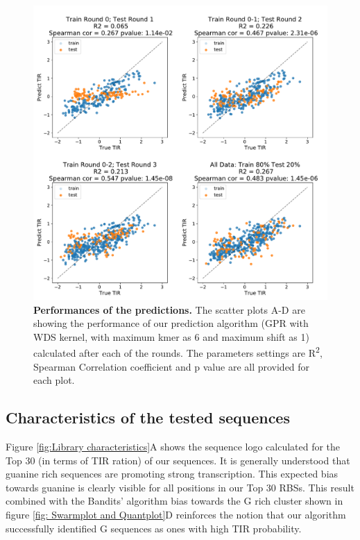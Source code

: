 \documentclass{article}
\begin{document}
\begin{figure}[!ht]
    \centering
    \includegraphics[scale=0.4]{plots/Main_Paper/scatter_abc1_FF.pdf}
    \caption{\textbf{Performances of the predictions.} The scatter plots A-D are showing the performance of our prediction algorithm (GPR with WDS kernel, with maximum kmer as 6 and maximum shift as 1) calculated after each of the rounds.
    The parameters settings are 
    R\textsuperscript{2}, Spearman Correlation coefficient and p value are all provided for each plot.}
    \label{fig: Scatterplot}
\end{figure}

\subsection{Characteristics of the tested sequences}

Figure \ref{fig:Library characteristics}A shows the sequence logo calculated for the Top 30 (in terms of TIR ration) of our sequences.
It is generally understood that guanine rich sequences are promoting strong transcription.
This expected bias towards guanine is clearly visible for all positions in our Top 30 RBSs.
This result combined with the Bandits' algorithm bias towards the G rich cluster shown in figure \ref{fig: Swarmplot and Quantplot}D reinforces the notion that our algorithm successfully identified G sequences as ones with high TIR probability.
\end{document}
